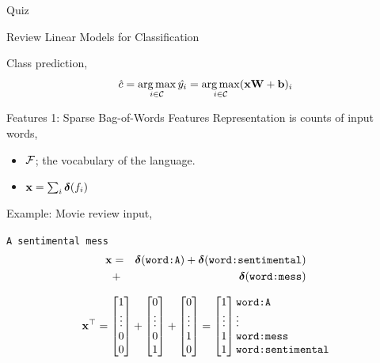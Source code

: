 \documentclass{beamer}
\begin{document}
\begin{frame}{Quiz}
\begin{itemize}
\begin{frame}{Review Linear Models for Classification}
  \air

  Class prediction,
  \[ \hat{c} = \argmax_{i \in \mcC} \hat{y_i}  = \argmax_{i \in \mcC} (\boldx \boldW + \boldb)_i    \]
\end{frame}

\begin{frame}{Features 1: Sparse Bag-of-Words Features}
  Representation is counts of input words, 
  \begin{itemize}
  \item $\mathcal{F}$; the vocabulary of the language.
  \item $\mathbf{x} = \sum_{i} \boldsymbol{\delta}(f_i)$ 
  \end{itemize}

  Example: Movie review input, 
  \begin{center}
    \texttt{A sentimental mess}
    \begin{eqnarray*}
      \mathbf{x} &=& \boldsymbol{\delta}(\texttt{word:A}) + \boldsymbol{\delta}(\texttt{word:sentimental}) \\ 
    &+& \boldsymbol{\delta}(\texttt{word:mess})
    \end{eqnarray*}

    \[ \boldx^\top =\begin{bmatrix} 1 \\ \vdots
        \\ 0\\ 0 \\ \end{bmatrix} +\begin{bmatrix} 0 \\
        \vdots \\ 0\\ 1 \\ \end{bmatrix} +
     \begin{bmatrix} 0 \\ \vdots \\ 1\\ 0 \\ \end{bmatrix} 
    =\begin{bmatrix} 1 \\ \vdots \\ 1 \\ 1 \\ \end{bmatrix} 
    \begin{matrix*}[l] \mathrm{\texttt{word:A}} \\ \vdots \\ \mathrm{\texttt{word:mess}} \\ \mathrm{\texttt{word:sentimental}} \\ \end{matrix*}
     \]
  \end{center}
\end{frame}



\end{itemize}
\end{frame}
\end{document}
